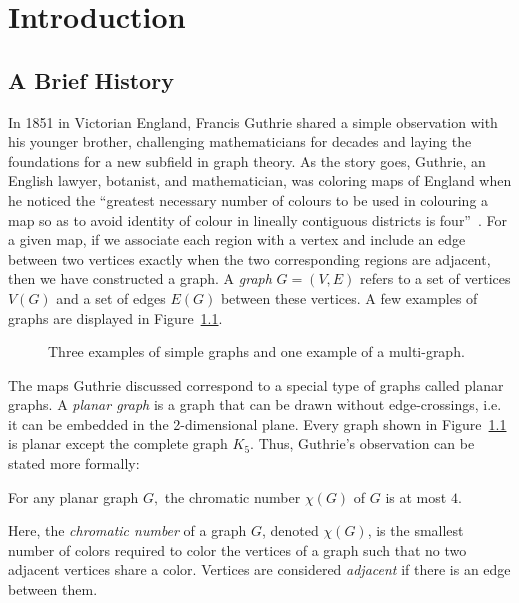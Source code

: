 
\chapter{Introduction}\label{chapter intro}
\section{A Brief History}\label{section history}
In 1851 in Victorian England, Francis Guthrie shared a simple observation with his younger brother, challenging mathematicians for decades and laying the foundations for a new subfield in graph theory. As the story goes, Guthrie, an English lawyer, botanist, and mathematician, was coloring maps of England when he noticed the ``greatest necessary number of colours to be used in colouring a map so as to avoid identity of colour in lineally contiguous districts is four''~\cite{FGbro}. For a given map, if we associate each region with a vertex and include an edge between two vertices exactly when the two corresponding regions are adjacent, then we have constructed a graph. A \textit{graph} $G = (V, E)$ refers to a set of vertices $V(G)$ and a set of edges $E(G)$ between these vertices. A few examples of graphs are displayed in Figure~\ref{fig:graphs}.
\begin{figure}
    \centering
    
    \caption{Three examples of simple graphs and one example of a multi-graph.}
    \label{fig:graphs}
\end{figure}
The maps Guthrie discussed correspond to a special type of graphs called planar graphs. A \textit{planar graph} is a graph that can be drawn without edge-crossings, i.e. it can be embedded in the 2-dimensional plane. Every graph shown in Figure~\ref{fig:graphs} is planar except the complete graph $K_5.$ Thus, Guthrie's observation can be stated more formally:
\begin{theorem}\label{four_color_thm}
    For any planar graph $G,$ the chromatic number $\chi(G)$ of $G$ is at most $4$.
\end{theorem}
Here, the \textit{chromatic number} of a graph $G$, denoted $\chi(G)$, is the smallest number of colors required to color the vertices of a graph such that no two adjacent vertices share a color. Vertices are considered \textit{adjacent} if there is an edge between them.

